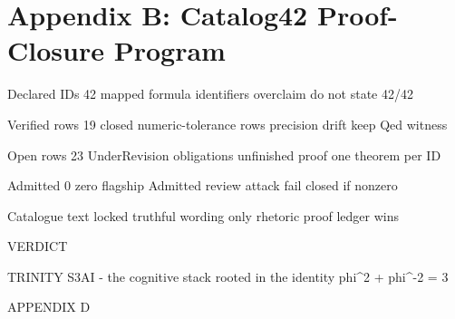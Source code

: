 
\section{Appendix B: Catalog42 Proof-Closure Program}

Declared IDs                       42                        mapped formula identifiers       overclaim                   do not state 42/42

 Verified rows                      19                        closed numeric-tolerance rows    precision drift             keep Qed witness

 Open rows                          23                        UnderRevision obligations        unfinished proof            one theorem per ID

 Admitted                           0                         zero flagship Admitted           review attack               fail closed if nonzero

 Catalogue text                     locked                    truthful wording only            rhetoric                    proof ledger wins

  VERDICT

                                  TRINITY S3AI - the cognitive stack rooted in the identity phi\textasciicircum{}2 + phi\textasciicircum{}-2 = 3

                                                             APPENDIX D